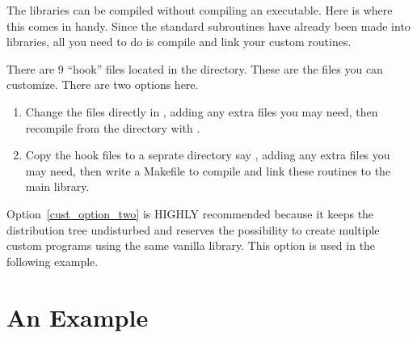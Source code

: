 The \tao libraries can be compiled without compiling an executable. Here is
where this comes in handy. Since the standard \tao subroutines have already been
made into libraries, all you need to do is compile and link your custom
routines.

There are 9 ``hook'' files located in the  directory. These are
the files you can customize. There are two options here. 
\begin{enumerate}
  \item Change the files directly in , adding any extra
    files you may need, then recompile from the  directory with
  .  \label{cust_option_one}
  \item Copy the hook files to a seprate directory say ,
adding any extra files you may need, then write a Makefile to compile and link these
routines to the main \tao library.
\label{cust_option_two}
\end{enumerate}
Option~\ref{cust_option_two} is HIGHLY recommended because it keeps the \tao
distribution tree undisturbed and reserves the possibility to create multiple
custom \tao programs using the same vanilla \tao library. This option is used in
the following example.

\section{An Example}

